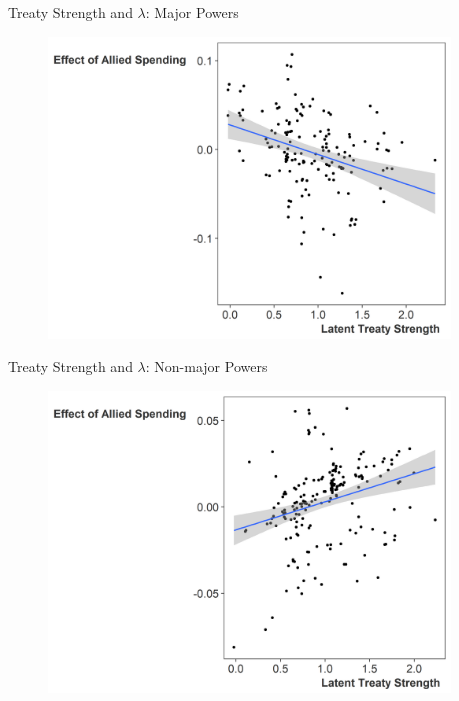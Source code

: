 \documentclass{beamer}
\begin{document}
\begin{frame}{Treaty Strength and $\lambda$: Major Powers}

\begin{figure}[htbp]
	\centering
		\includegraphics[width=0.95\textwidth]{ls-lambda-maj.png}
	\label{fig:ls-lambda-maj}
\end{figure}



\end{frame}




\begin{frame}{Treaty Strength and $\lambda$: Non-major Powers}

\begin{figure}
	\centering
		\includegraphics[width=0.95\textwidth]{ls-lambda-min.png}
	\label{fig:ls-lambda-min}
\end{figure}



\end{frame}
\end{document}
